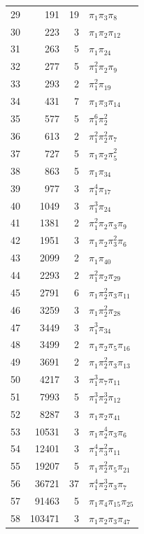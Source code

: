 \documentclass[11pt,a4paper]{article}
\theoremstyle{definition}
\theoremstyle{remark}
\numberwithin{equation}{section}
\begin{document}
{\begin{longtable}{r r r l}
29 & 191 & 19 & $\pi_{1}\pi_{3}\pi_{8}$ \\
30 & 223 & 3 & $\pi_{1}\pi_{2}\pi_{12}$ \\
31 & 263 & 5 & $\pi_{1}\pi_{24}$ \\
32 & 277 & 5 & $\pi_{1}^{2}\pi_{2}\pi_{9}$ \\
33 & 293 & 2 & $\pi_{1}^{2}\pi_{19}$ \\
34 & 431 & 7 & $\pi_{1}\pi_{3}\pi_{14}$ \\
35 & 577 & 5 & $\pi_{1}^{6}\pi_{2}^{2}$ \\
36 & 613 & 2 & $\pi_{1}^{2}\pi_{2}^{2}\pi_{7}$ \\
37 & 727 & 5 & $\pi_{1}\pi_{2}\pi_{5}^{2}$ \\
38 & 863 & 5 & $\pi_{1}\pi_{34}$ \\
39 & 977 & 3 & $\pi_{1}^{4}\pi_{17}$ \\
40 & 1049 & 3 & $\pi_{1}^{3}\pi_{24}$ \\
41 & 1381 & 2 & $\pi_{1}^{2}\pi_{2}\pi_{3}\pi_{9}$ \\
42 & 1951 & 3 & $\pi_{1}\pi_{2}\pi_{3}^{2}\pi_{6}$ \\
43 & 2099 & 2 & $\pi_{1}\pi_{40}$ \\
44 & 2293 & 2 & $\pi_{1}^{2}\pi_{2}\pi_{29}$ \\
45 & 2791 & 6 & $\pi_{1}\pi_{2}^{2}\pi_{3}\pi_{11}$ \\
46 & 3259 & 3 & $\pi_{1}\pi_{2}^{2}\pi_{28}$ \\
47 & 3449 & 3 & $\pi_{1}^{3}\pi_{34}$ \\
48 & 3499 & 2 & $\pi_{1}\pi_{2}\pi_{5}\pi_{16}$ \\
49 & 3691 & 2 & $\pi_{1}\pi_{2}^{2}\pi_{3}\pi_{13}$ \\
50 & 4217 & 3 & $\pi_{1}^{3}\pi_{7}\pi_{11}$ \\
51 & 7993 & 5 & $\pi_{1}^{3}\pi_{2}^{3}\pi_{12}$ \\
52 & 8287 & 3 & $\pi_{1}\pi_{2}\pi_{41}$ \\
53 & 10531 & 3 & $\pi_{1}\pi_{2}^{4}\pi_{3}\pi_{6}$ \\
54 & 12401 & 3 & $\pi_{1}^{4}\pi_{3}^{2}\pi_{11}$ \\
55 & 19207 & 5 & $\pi_{1}\pi_{2}^{2}\pi_{5}\pi_{21}$ \\
56 & 36721 & 37 & $\pi_{1}^{4}\pi_{2}^{3}\pi_{3}\pi_{7}$ \\
57 & 91463 & 5 & $\pi_{1}\pi_{4}\pi_{15}\pi_{25}$ \\
58 & 103471 & 3 & $\pi_{1}\pi_{2}\pi_{3}\pi_{47}$ \\

\end{longtable}}
\end{document}
